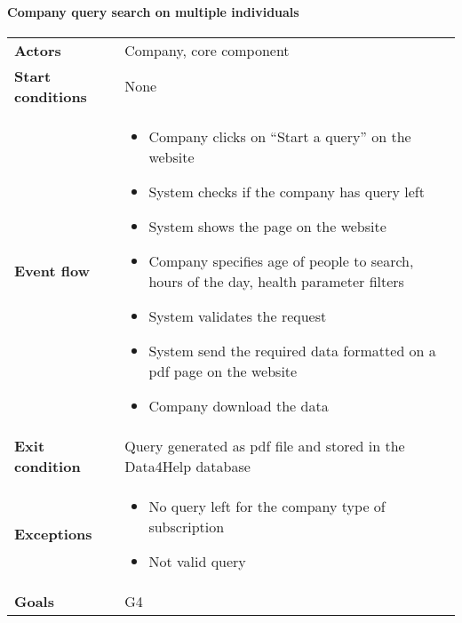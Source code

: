\paragraph{Company query search on multiple individuals}
\begin{center}
\begin{table}[H]
\centering
\begin{tabular}{l|l}
\textbf{Actors} &
Company, core component
 \\
\textbf{Start conditions} & None \\
\textbf{Event flow}  &  \begin{minipage}[t]{0.7\textwidth}
    \begin{itemize}
        \item Company clicks on “Start a query” on the website


        \item System checks if the company has query left

        \item System shows the page on the website
        \item Company specifies age of people to search, hours of the day, health parameter filters
 
        \item System validates the request
        \item System send the required data formatted on a pdf page on the website
        \item Company download the data

    \end{itemize}
    
\end{minipage} \\
\textbf{Exit condition} & Query generated as pdf file and stored in the Data4Help database \\
\textbf{Exceptions} & \begin{minipage}[t]{0.7\textwidth}
    \begin{itemize}
        \item No query left for the company type of subscription
        \item Not valid query
    \end{itemize}
    
\end{minipage} \\
\textbf{Goals} & G4
\end{tabular}

\end{table}
\end{center}











